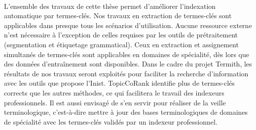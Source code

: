     ~\\L'ensemble des travaux de cette thèse permet d'améliorer l'indexation
    automatique par termes-clés. Nos travaux en extraction de termes-clés sont
    applicables dans presque tous les scénarios d'utilisation. Aucune ressource
    externe n'est nécessaire à l'exception de celles requises par les outils de
    prétraitement (segmentation et étiquetage grammatical). Ceux en
    extraction et assignement simultanés de termes-clés sont applicables en
    domaines de spécialité, dès lors que des données d'entraînement sont
    disponibles. Dans le cadre du projet Termith, les résultats de nos travaux
    seront exploités pour faciliter la recherche d'information avec les outils
    que propose l'Inist. TopicCoRank identifie plus de termes-clés corrects que
    les autres méthodes, ce qui facilitera le travail des indexeurs
    professionnels.
    Il est aussi envisagé de s'en servir pour réaliser de
    la veille terminologique, c'est-à-dire mettre à jour des bases
    terminologiques de domaines de spécialité avec les termes-clés validés par
    un indexeur professionnel.


